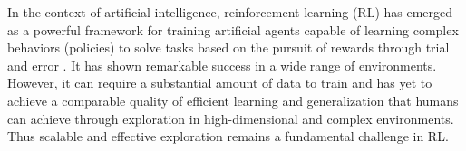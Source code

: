 


\newpage
In the context of artificial intelligence, reinforcement learning (RL) has emerged as a powerful framework for training artificial agents capable of learning complex behaviors (policies) to solve tasks based on the pursuit of rewards through trial and error \citep{sutton2018reinforcement}.
It has shown remarkable success in a wide range of environments.
However, it can require a substantial amount of data to train and has yet to achieve a comparable quality of efficient learning and generalization that humans can achieve through exploration in high-dimensional and complex environments.
Thus scalable and effective exploration remains a fundamental challenge in RL. 


